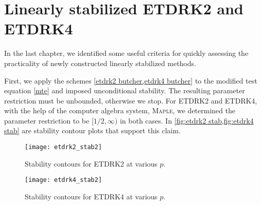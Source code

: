 \section{Linearly stabilized ETDRK2 and ETDRK4}
In the last chapter, we identified some useful criteria for quickly assessing the practicality of newly constructed linearly stabilized methods. 

First, we apply the schemes \cref{etdrk2 butcher,etdrk4 butcher} to the modified test equation \cref{mte} and imposed unconditional stability. The resulting parameter restriction must be unbounded, otherwise we stop. For ETDRK2 and ETDRK4, with the help of the computer algebra system, \textsc{Maple}\textsuperscript{\texttrademark}, we determined the parameter restriction to be $[1/2, \infty)$ in both cases. In \cref{fig:etdrk2 stab,fig:etdrk4 stab} are stability contour plots that support this claim.

\begin{figure}[htb!]
	\centering
\texttt{[image: etdrk2\_stab2]}
\caption{Stability contours for ETDRK2 at various $p$.}
\label{fig:etdrk2 stab}
\end{figure}

\begin{figure}[htb!]
	\centering
\texttt{[image: etdrk4\_stab2]}
\caption{Stability contours for ETDRK4 at various $p$.}
\label{fig:etdrk4 stab}
\end{figure}

